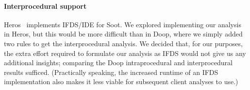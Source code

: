 





\paragraph{Interprocedural support} Heros~\cite{bodden12:_inter_proced_data_flow_analy} implements IFDS/IDE for Soot. We explored implementing our analysis in Heros, but this would be more difficult than in Doop, where we simply added two rules to get the interprocedural analysis. We decided that, for our purposes, the extra effort required to formulate our analysis as IFDS would not give us any additional insights; comparing the Doop intraprocedural and interprocedural results sufficed. (Practically speaking, the increased runtime of an IFDS implementation also makes it less viable for subsequent client analyses to use.)

